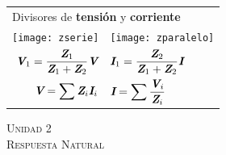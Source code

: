 \documentclass[11pt,a4paper,twocolumn]{article}
\newcommand{\fasor}[1]{\textit{\textbf{#1}}}
\newcommand{\unidad}[2]{\begin{center}
		\fontsize{10}{10}\selectfont\color{gray!50!black}\scshape Unidad #1 \\
		\fontsize{14}{14}\selectfont \scshape #2
\end{center} \vspace{-.6cm}}
\begin{document}
\begin{tcolorbox}[colback=white!97!brown, colframe=brown!15!gray]
\begin{tabular}{r l}
		\multicolumn{2}{l}{\vspace{.2cm}Divisores de \textbf{tensión} y \textbf{corriente}} \\
		
	\hspace{-.4cm}	\texttt{[image: zserie]}	& \hspace{-.35cm} \texttt{[image: zparalelo]} \\
	$\fasor{V}_{1} = \dfrac{\fasor{Z}_{1}}{\fasor{Z}_{1}+\fasor{Z}_{2}}\fasor{V}  $\hspace{.9cm} &  \vspace{.2cm}\hspace{.2cm} $ \fasor{I}_{1} = \dfrac{\fasor{Z}_{2}}{\fasor{Z}_{1}+\fasor{Z}_{2}}\fasor{I}  $ \\
	$ \fasor{V}=\displaystyle\sum \fasor{Z}_{i}\fasor{I}_{i} $ \hspace{.8cm} &  \hspace{.5cm} $ \fasor{I} =\displaystyle\sum \dfrac{\fasor{V}_{i}}{\fasor{Z}_{i}} $ \\
	
		
		\end{tabular}	

	\end{tcolorbox}


	\newpage

	
\unidad{2}{Respuesta Natural}
	
\end{document}
